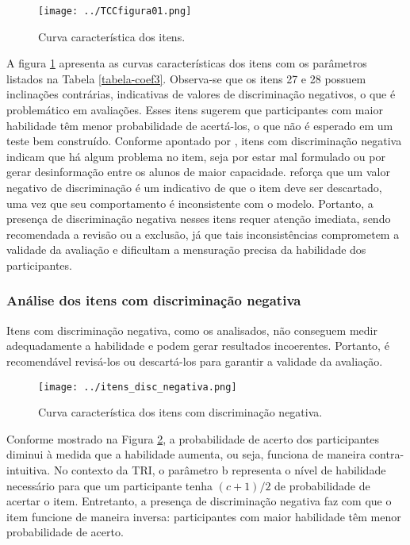 \begin{figure}[!htb]
	\centering
	\caption{Curva característica dos itens.}
	\texttt{[image: ../TCCfigura01.png]}
	\parbox{\textwidth}{
		\centering %
	}
	\label{fig:curva_itens}
\end{figure}

A figura \ref{fig:curva_itens} apresenta as curvas características dos itens com os parâmetros listados na Tabela \ref{tabela-coef3}. Observa-se que os itens 27 e 28 possuem inclinações contrárias, indicativas de valores de discriminação negativos, o que é problemático em avaliações. Esses itens sugerem que participantes com maior habilidade têm menor probabilidade de acertá-los, o que não é esperado em um teste bem construído. Conforme apontado por , itens com discriminação negativa indicam que há algum problema no item, seja por estar mal formulado ou por gerar desinformação entre os alunos de maior capacidade.  reforça que um valor negativo de discriminação é um indicativo de que o item deve ser descartado, uma vez que seu comportamento é inconsistente com o modelo. Portanto, a presença de discriminação negativa nesses itens requer atenção imediata, sendo recomendada a revisão ou a exclusão, já que tais inconsistências comprometem a validade da avaliação e dificultam a mensuração precisa da habilidade dos participantes.


\subsubsection{Análise dos itens com discriminação negativa}

Itens com discriminação negativa, como os analisados, não conseguem medir adequadamente a habilidade e podem gerar resultados incoerentes. Portanto, é recomendável revisá-los ou descartá-los para garantir a validade da avaliação.


\begin{figure}[!htb]
	\centering
	\caption{Curva característica dos itens com discriminação negativa.}
	\texttt{[image: ../itens\_disc\_negativa.png]}
	\parbox{\textwidth}{
		\centering %
	}
	\label{fig:itens_disc_negativa}
\end{figure}


Conforme mostrado na Figura \ref{fig:itens_disc_negativa}, a probabilidade de acerto dos participantes diminui à medida que a habilidade aumenta, ou seja, funciona de maneira contra-intuitiva. No contexto da TRI, o parâmetro b representa o nível de habilidade necessário para que um participante tenha $(c+1)/2$ de probabilidade de acertar o item. Entretanto, a presença de discriminação negativa faz com que o item funcione de maneira inversa: participantes com maior habilidade têm menor probabilidade de acerto.

